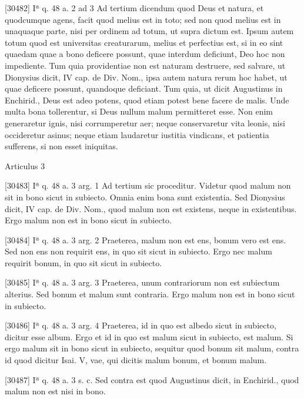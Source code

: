 \documentclass[10pt]{jsarticle} %
\begin{document}
[30482] Iª q. 48 a. 2 ad 3 Ad tertium dicendum quod Deus et natura, et quodcumque agens, facit quod melius est in toto; sed non quod melius est in unaquaque parte, nisi per ordinem ad totum, ut supra dictum est. Ipsum autem totum quod est universitas creaturarum, melius et perfectius est, si in eo sint quaedam quae a bono deficere possunt, quae interdum deficiunt, Deo hoc non impediente. Tum quia providentiae non est naturam destruere, sed salvare, ut Dionysius dicit, IV cap. de Div. Nom., ipsa autem natura rerum hoc habet, ut quae deficere possunt, quandoque deficiant. Tum quia, ut dicit Augustinus in Enchirid., Deus est adeo potens, quod etiam potest bene facere de malis. Unde multa bona tollerentur, si Deus nullum malum permitteret esse. Non enim generaretur ignis, nisi corrumperetur aer; neque conservaretur vita leonis, nisi occideretur asinus; neque etiam laudaretur iustitia vindicans, et patientia sufferens, si non esset iniquitas.

Articulus 3

[30483] Iª q. 48 a. 3 arg. 1 Ad tertium sic proceditur. Videtur quod malum non sit in bono sicut in subiecto. Omnia enim bona sunt existentia. Sed Dionysius dicit, IV cap. de Div. Nom., quod malum non est existens, neque in existentibus. Ergo malum non est in bono sicut in subiecto.

[30484] Iª q. 48 a. 3 arg. 2 Praeterea, malum non est ens, bonum vero est ens. Sed non ens non requirit ens, in quo sit sicut in subiecto. Ergo nec malum requirit bonum, in quo sit sicut in subiecto.

[30485] Iª q. 48 a. 3 arg. 3 Praeterea, unum contrariorum non est subiectum alterius. Sed bonum et malum sunt contraria. Ergo malum non est in bono sicut in subiecto.

[30486] Iª q. 48 a. 3 arg. 4 Praeterea, id in quo est albedo sicut in subiecto, dicitur esse album. Ergo et id in quo est malum sicut in subiecto, est malum. Si ergo malum sit in bono sicut in subiecto, sequitur quod bonum sit malum, contra id quod dicitur Isai. V, vae, qui dicitis malum bonum, et bonum malum.

[30487] Iª q. 48 a. 3 s. c. Sed contra est quod Augustinus dicit, in Enchirid., quod malum non est nisi in bono.
\end{document}
